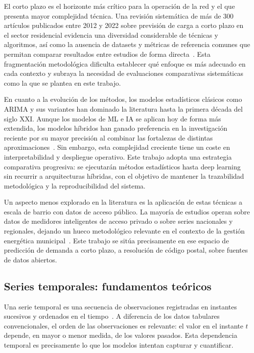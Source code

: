 \documentclass[12pt, a4paper]{article}
\begin{document}
El corto plazo es el horizonte más crítico para la operación de la red y el que presenta mayor complejidad técnica. Una revisión sistemática de más de 300 artículos publicados entre 2012 y 2022 sobre previsión de carga a corto plazo en el sector residencial evidencia una diversidad considerable de técnicas y algoritmos, así como la ausencia de datasets y métricas de referencia comunes que permitan comparar resultados entre estudios de forma directa~\cite{melicio2023}. Esta fragmentación metodológica dificulta establecer qué enfoque es más adecuado en cada contexto y subraya la necesidad de evaluaciones comparativas sistemáticas como la que se plantea en este trabajo.

En cuanto a la evolución de los métodos, los modelos estadísticos clásicos como ARIMA y sus variantes han dominado la literatura hasta la primera década del siglo XXI. Aunque los modelos de ML e IA se aplican hoy de forma más extendida, los modelos híbridos han ganado preferencia en la investigación reciente por su mayor precisión al combinar las fortalezas de distintas aproximaciones~\cite{ugbehe2025}. Sin embargo, esta complejidad creciente tiene un coste en interpretabilidad y despliegue operativo. Este trabajo adopta una estrategia comparativa progresiva: se ejecutarán métodos estadísticos hasta deep learning sin recurrir a arquitecturas híbridas, con el objetivo de mantener la trazabilidad metodológica y la reproducibilidad del sistema.

Un aspecto menos explorado en la literatura es la aplicación de estas técnicas a escala de barrio con datos de acceso público. La mayoría de estudios operan sobre datos de medidores inteligentes de acceso privado o sobre series nacionales y regionales, dejando un hueco metodológico relevante en el contexto de la gestión energética municipal~\cite{jiang2024}. Este trabajo se sitúa precisamente en ese espacio de predicción de demanda a corto plazo, a resolución de código postal, sobre fuentes de datos abiertos.

\subsection{Series temporales: fundamentos teóricos}

Una serie temporal es una secuencia de observaciones registradas en instantes sucesivos y ordenados en el tiempo~\cite{hyndman2021}. A diferencia de los datos tabulares convencionales, el orden de las observaciones es relevante: el valor en el instante $t$ depende, en mayor o menor medida, de los valores pasados. Esta dependencia temporal es precisamente lo que los modelos intentan capturar y cuantificar.
\end{document}
